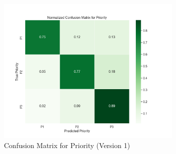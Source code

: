 \clearpage 



\begin{figure}[t!]
    \centering
    \includegraphics[width=0.8\textwidth]{ch4/assets/v1_confusion_priority.png}
    \caption{Confusion Matrix for Priority (Version 1)}
    \label{fig:confusion_priority_v1}
\end{figure}

